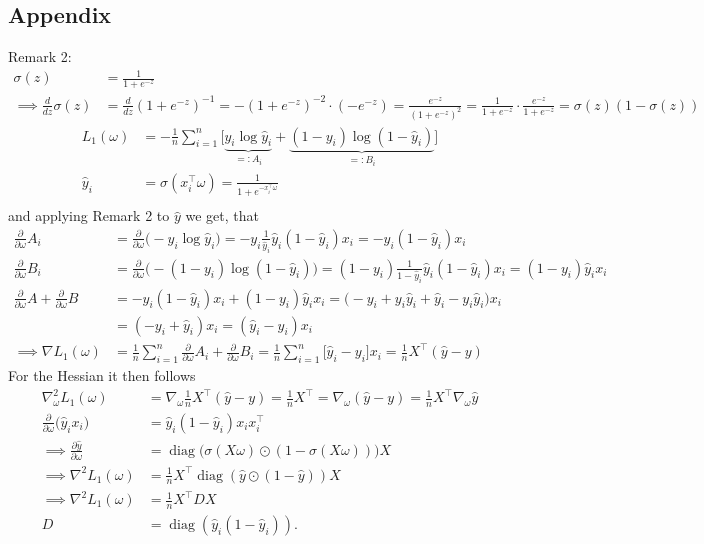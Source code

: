 \documentclass{article}
\begin{document}
\subsection{Appendix}
Remark 2:
\begin{align*}
  \sigma(z) &= \frac{1}{1 + e^{-z}} \\
  \implies \frac{d}{dz} \sigma(z) &= \frac{d}{dz} (1 + e^{-z})^{-1}
  = -(1 + e^{-z})^{-2} \cdot (-e^{-z}) = \frac{e^{-z}}{(1 + e^{-z})^2}
  = \frac{1}{1 + e^{-z}} \cdot \frac{e^{-z}}{1 + e^{-z}}
  = \sigma(z) (1 - \sigma(z))
\end{align*}
\begin{align*}
L_1(\omega) &= -\frac{1}{n} \sum_{i=1}^n \Big[\underbrace{y_i \log \hat{y}_i}_{=:A_i} + \underbrace{(1 - y_i) \log (1 - \hat{y}_i)}_{=:B_i}\Big] \\
\hat{y}_i &= \sigma(x_i^\top \omega) = \frac{1}{1 + e^{-x_i^\top \omega}} \\
\end{align*}
and applying Remark 2 to $\hat{y}$ we get, that
\begin{align*}
\frac{\partial}{\partial \omega} A_i &= \frac{\partial}{\partial \omega}\big(-y_i \log \hat{y}_i\big) = -y_i \frac{1}{\hat{y}_i} \hat{y}_i (1 - \hat{y}_i) x_i = -y_i (1 - \hat{y}_i) x_i \\
%
\frac{\partial}{\partial \omega} B_i &=\frac{\partial}{\partial \omega} \big(-(1 - y_i) \log (1 - \hat{y}_i)\big) = (1 - y_i) \frac{1}{1 - \hat{y}_i} \hat{y}_i (1 - \hat{y}_i) x_i = (1 - y_i) \hat{y}_i x_i\\
%
\frac{\partial}{\partial \omega} A+\frac{\partial}{\partial \omega} B &= -y_i (1 - \hat{y}_i) x_i + (1 - y_i) \hat{y}_i x_i 
= \big(-y_i + y_i \hat{y}_i + \hat{y}_i - y_i \hat{y}_i \big) x_i\\
&= (-y_i + \hat{y}_i) x_i = (\hat{y}_i-y_i ) x_i\\
%
\implies \nabla L_1(\omega) &= \frac{1}{n} \sum_{i=1}^n \frac{\partial}{\partial \omega} A_i+\frac{\partial}{\partial \omega} B_i
= \frac{1}{n} \sum_{i=1}^n \big[\hat{y}_i - y_i\big] x_i = \frac{1}{n} X^\top (\hat{y} - y)
\end{align*}
For the Hessian it then follows
\begin{align*}
\nabla^2 _\omega L_1(\omega) &= \nabla_\omega \frac{1}{n} X^\top (\hat{y} - y) 
= \frac{1}{n} X^\top  
= \nabla _\omega (\hat{y}-y)
= \frac{1}{n} X^\top  \nabla _\omega \hat{y} \\
%
\frac{\partial}{\partial \omega} \big( \hat{y}_i x_i \big) 
&= \hat{y}_i (1 - \hat{y}_i) x_i x_i^\top\\
%
\implies \frac{\partial \hat{y}}{\partial \omega} &= \operatorname{diag}\bigl(\sigma(X\omega) \odot (1 - \sigma(X\omega))\bigr) X \\
%
\implies \nabla^2 L_1(\omega) &= \frac{1}{n} X^\top \operatorname{diag}(\hat{y} \odot (1 - \hat{y})) X \\
%
\implies \nabla^2 L_1(\omega) &= \frac{1}{n} X^\top D X\\
D &= \operatorname{diag}(\hat{y}_i (1 - \hat{y}_i)).
\end{align*}
\end{document}

